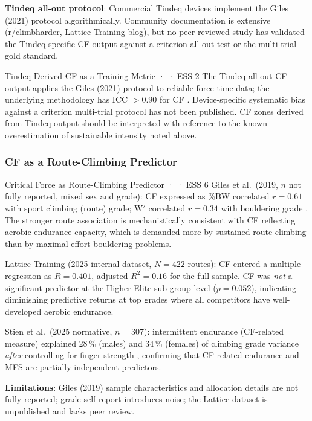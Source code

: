 \textbf{Tindeq all-out protocol}: Commercial Tindeq devices implement the Giles (2021) protocol algorithmically.
Community documentation is extensive (r/climbharder, Lattice Training blog), but no peer-reviewed study has validated the Tindeq-specific CF output against a criterion all-out test or the multi-trial gold standard.

\begin{bioplausbox}{Tindeq-Derived CF as a Training Metric · \bioplausible · ESS 2}
The Tindeq all-out CF output applies the Giles (2021) protocol to reliable force-time data; the underlying methodology has ICC $> 0.90$ for CF \cite{GHM+21, BGJ+24}.
Device-specific systematic bias against a criterion multi-trial protocol has not been published.
CF zones derived from Tindeq output should be interpreted with reference to the known overestimation of sustainable intensity noted above.
\end{bioplausbox}

\subsubsection{CF as a Route-Climbing Predictor}

\begin{evidencebox}{Critical Force as Route-Climbing Predictor · \evidencebacked · ESS 6}
Giles et al.\ (2019, $n$ not fully reported, mixed sex and grade): CF expressed as \%BW correlated $r = 0.61$ with sport climbing (route) grade; W$'$ correlated $r = 0.34$ with bouldering grade \cite{GCT+19}.
The stronger route association is mechanistically consistent with CF reflecting aerobic endurance capacity, which is demanded more by sustained route climbing than by maximal-effort bouldering problems.

Lattice Training (2025 internal dataset, $N = 422$ routes): CF entered a multiple regression as $R = 0.401$, adjusted $R^2 = 0.16$ for the full sample.
CF was \emph{not} a significant predictor at the Higher Elite sub-group level ($p = 0.052$), indicating diminishing predictive returns at top grades where all competitors have well-developed aerobic endurance.

Stien et al.\ (2025 normative, $n = 307$): intermittent endurance (CF-related measure) explained 28\,\% (males) and 34\,\% (females) of climbing grade variance \emph{after} controlling for finger strength \cite{BMK+25}, confirming that CF-related endurance and MFS are partially independent predictors.

\textbf{Limitations}: Giles (2019) sample characteristics and allocation details are not fully reported; grade self-report introduces noise; the Lattice dataset is unpublished and lacks peer review.
\end{evidencebox}

